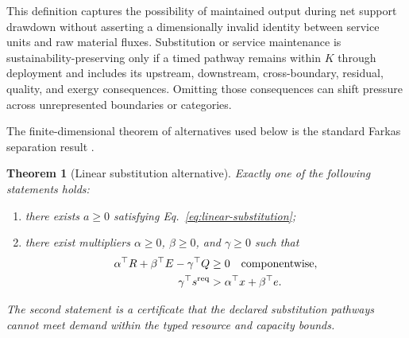 \documentclass[11pt]{article}
\newtheorem{theorem}{Theorem}
\theoremstyle{definition}
\begin{document}
This definition captures the possibility of maintained output during net support drawdown without asserting a dimensionally invalid identity between service units and raw material fluxes. Substitution or service maintenance is sustainability-preserving only if a timed pathway remains within $K$ through deployment and includes its upstream, downstream, cross-boundary, residual, quality, and exergy consequences. Omitting those consequences can shift pressure across unrepresented boundaries or categories.

The finite-dimensional theorem of alternatives used below is the standard Farkas separation result \cite{rockafellar1970}.

\begin{theorem}[Linear substitution alternative]
\label{thm:farkas}
Exactly one of the following statements holds:

\begin{enumerate}[label=(\roman*)]
\item there exists $a\ge0$ satisfying Eq.~\eqref{eq:linear-substitution};
\item there exist multipliers $\alpha\ge0$, $\beta\ge0$, and $\gamma\ge0$ such that
\begin{align}
\alpha^\top R+\beta^\top E-\gamma^\top Q&\ge0
\quad\text{componentwise}, \label{eq:dual-tech}\\
\gamma^\top s^{\rm req}&>\alpha^\top x+\beta^\top e. \label{eq:dual-shortfall}
\end{align}
\end{enumerate}
The second statement is a certificate that the declared substitution pathways cannot meet demand within the typed resource and capacity bounds.
\end{theorem}
\end{document}
